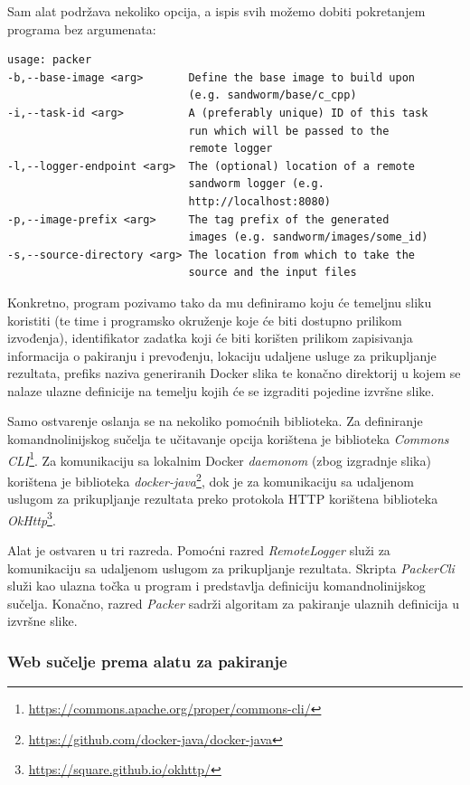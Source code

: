 \documentclass[times, utf8, zavrsni]{fer}
\begin{document}
{Sam alat podržava nekoliko opcija, a ispis svih možemo dobiti pokretanjem programa bez argumenata:

\begin{lstlisting}
usage: packer
-b,--base-image <arg>       Define the base image to build upon
                            (e.g. sandworm/base/c_cpp)
-i,--task-id <arg>          A (preferably unique) ID of this task
                            run which will be passed to the
                            remote logger
-l,--logger-endpoint <arg>  The (optional) location of a remote
                            sandworm logger (e.g.
                            http://localhost:8080)
-p,--image-prefix <arg>     The tag prefix of the generated
                            images (e.g. sandworm/images/some_id)
-s,--source-directory <arg> The location from which to take the
                            source and the input files
\end{lstlisting}

Konkretno, program pozivamo tako da mu definiramo koju će temeljnu sliku koristiti (te time i programsko okruženje koje će biti dostupno prilikom izvođenja), identifikator zadatka koji će biti korišten prilikom zapisivanja informacija o pakiranju i prevođenju, lokaciju udaljene usluge za prikupljanje rezultata, prefiks naziva generiranih Docker slika te konačno direktorij u kojem se nalaze ulazne definicije na temelju kojih će se izgraditi pojedine izvršne slike. 

Samo ostvarenje oslanja se na nekoliko pomoćnih biblioteka. Za definiranje komandnolinijskog sučelja te učitavanje opcija korištena je biblioteka {\textit{Commons CLI}}{\footnote{\url{https://commons.apache.org/proper/commons-cli/}}}. Za komunikaciju sa lokalnim Docker {\textit{daemonom}} (zbog izgradnje slika) korištena je biblioteka {\textit{docker-java}}{\footnote{\url{https://github.com/docker-java/docker-java}}}, dok je za komunikaciju sa udaljenom uslugom za prikupljanje rezultata preko protokola HTTP korištena biblioteka {\textit{OkHttp}}{\footnote{\url{https://square.github.io/okhttp/}}}.

Alat je ostvaren u tri razreda. Pomoćni razred {\textit{RemoteLogger}} služi za komunikaciju sa udaljenom uslugom za prikupljanje rezultata. Skripta {\textit{PackerCli}} služi kao ulazna točka u program i predstavlja definiciju komandnolinijskog sučelja. Konačno, razred {\textit{Packer}} sadrži algoritam za pakiranje ulaznih definicija u izvršne slike.

\subsubsection{Web sučelje prema alatu za pakiranje}

}
\end{document}
